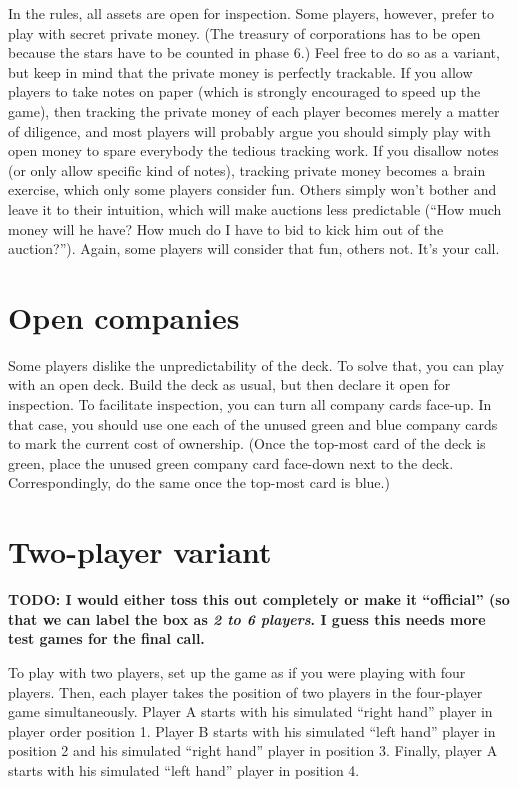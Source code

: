 \documentclass[10pt,final]{report}
\begin{document}
\begin{multicols}{2}
In the rules, all assets are open for inspection. Some players,
however, prefer to play with secret private money. (The treasury of
corporations has to be open because the stars have to be counted in
phase 6.) Feel free to do so as a variant, but keep in mind that the
private money is perfectly trackable. If you allow players to take
notes on paper (which is strongly encouraged to speed up the game),
then tracking the private money of each player becomes merely a matter
of diligence, and most players will probably argue you should simply
play with open money to spare everybody the tedious tracking work. If
you disallow notes (or only allow specific kind of notes), tracking
private money becomes a brain exercise, which only some players
consider fun. Others simply won't bother and leave it to their
intuition, which will make auctions less predictable (``How much money
will he have?  How much do I have to bid to kick him out of the
auction?''). Again, some players will consider that fun, others
not. It's your call.

\section{Open companies}

Some players dislike the unpredictability of the deck. To solve that,
you can play with an open deck. Build the deck as usual, but then
declare it open for inspection. To facilitate inspection, you can turn
all company cards face-up. In that case, you should use one each of
the unused green and blue company cards to mark the current cost of
ownership. (Once the top-most card of the deck is green, place the
unused green company card face-down next to the deck. Correspondingly,
do the same once the top-most card is blue.)

\section{Two-player variant}

\textbf{TODO: I would either toss this out completely or make it
  ``official'' (so that we can label the box as \emph{2 to 6
    players}. I guess this needs more test games for the final call.}

To play with two players, set up the game as if you were playing with
four players. Then, each player takes the position of two players in
the four-player game simultaneously. Player A starts with his
simulated ``right hand'' player in player order position 1. Player B
starts with his simulated ``left hand'' player in position 2 and his
simulated ``right hand'' player in position 3. Finally, player A
starts with his simulated ``left hand'' player in position 4.


\end{multicols}
\end{document}
